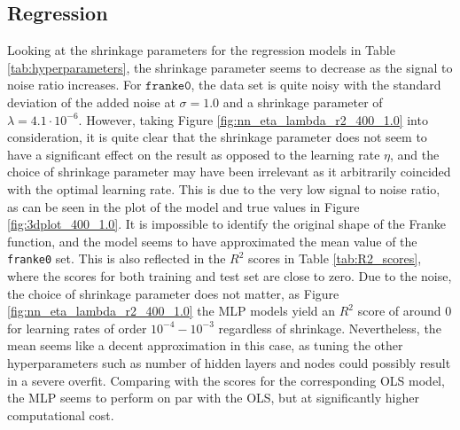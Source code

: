 \documentclass[a4paper, 11pt, twocolumn]{article}
\begin{document}
\subsection{Regression}
Looking at the shrinkage parameters for the regression models in Table 
\ref{tab:hyperparameters}, the shrinkage parameter seems to decrease as the 
signal to noise ratio increases. For $\texttt{franke0}$, the data set is quite 
noisy with the standard deviation of the added noise at $\sigma=1.0$ and a 
shrinkage parameter of $\lambda=4.1\cdot 10^{-6}$. However, taking Figure 
\ref{fig:nn_eta_lambda_r2_400_1.0} into consideration, it is quite clear that the 
shrinkage parameter does not seem to have a significant effect on the result as 
opposed to the learning rate $\eta$, and the choice of shrinkage parameter may 
have been irrelevant as it arbitrarily coincided with the optimal learning rate. 
This is due to the very low signal to noise ratio, as can be seen in the plot of 
the model and true values in Figure \ref{fig:3dplot_400_1.0}. It is impossible to 
identify the original shape of the Franke function, and the model seems to have 
approximated the mean value of the \texttt{franke0} set. This is also reflected 
in the $R^2$ scores in Table \ref{tab:R2_scores}, where the scores for both 
training and test set are close to zero. Due to the noise, the choice of 
shrinkage parameter does not matter, as Figure \ref{fig:nn_eta_lambda_r2_400_1.0} 
the MLP models yield an $R^2$ score of around 0 for learning rates of order 
$10^{-4}-10^{-3}$ regardless of shrinkage. Nevertheless, the mean seems like a 
decent approximation in this case, as tuning the other hyperparameters such as 
number of hidden layers and nodes could possibly result in a severe overfit. 
Comparing with the scores for the corresponding OLS model, the MLP seems to 
perform on par with the OLS, but at significantly higher computational cost. 
\end{document}
